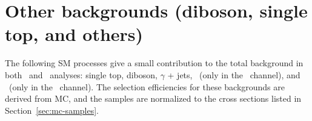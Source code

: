 \section{Other backgrounds (diboson, single top, and others)}
\label{sec:OtherBkg}

The following SM processes give a small contribution to the total background in both \eejj~and 
\enujj~analyses: single top, diboson, $\gamma$ + jets, \zjets~(only in the \enujj~channel), 
and \wjets~(only in the \eejj~channel). The selection efficiencies for these backgrounds are derived from MC, 
and the samples are normalized to the cross sections listed in Section~\ref{sec:mc-samples}.
  
